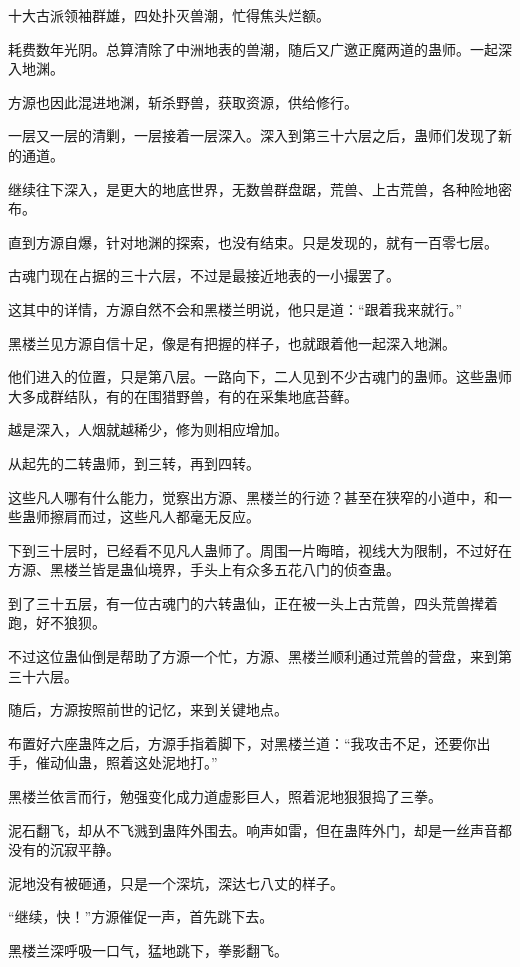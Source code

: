 \begin{this_body}
十大古派领袖群雄，四处扑灭兽潮，忙得焦头烂额。

耗费数年光阴。总算清除了中洲地表的兽潮，随后又广邀正魔两道的蛊师。一起深入地渊。

方源也因此混进地渊，斩杀野兽，获取资源，供给修行。

一层又一层的清剿，一层接着一层深入。深入到第三十六层之后，蛊师们发现了新的通道。

继续往下深入，是更大的地底世界，无数兽群盘踞，荒兽、上古荒兽，各种险地密布。

直到方源自爆，针对地渊的探索，也没有结束。只是发现的，就有一百零七层。

古魂门现在占据的三十六层，不过是最接近地表的一小撮罢了。

这其中的详情，方源自然不会和黑楼兰明说，他只是道：“跟着我来就行。”

黑楼兰见方源自信十足，像是有把握的样子，也就跟着他一起深入地渊。

他们进入的位置，只是第八层。一路向下，二人见到不少古魂门的蛊师。这些蛊师大多成群结队，有的在围猎野兽，有的在采集地底苔藓。

越是深入，人烟就越稀少，修为则相应增加。

从起先的二转蛊师，到三转，再到四转。

这些凡人哪有什么能力，觉察出方源、黑楼兰的行迹？甚至在狭窄的小道中，和一些蛊师擦肩而过，这些凡人都毫无反应。

下到三十层时，已经看不见凡人蛊师了。周围一片晦暗，视线大为限制，不过好在方源、黑楼兰皆是蛊仙境界，手头上有众多五花八门的侦查蛊。

到了三十五层，有一位古魂门的六转蛊仙，正在被一头上古荒兽，四头荒兽撵着跑，好不狼狈。

不过这位蛊仙倒是帮助了方源一个忙，方源、黑楼兰顺利通过荒兽的营盘，来到第三十六层。

随后，方源按照前世的记忆，来到关键地点。

布置好六座蛊阵之后，方源手指着脚下，对黑楼兰道：“我攻击不足，还要你出手，催动仙蛊，照着这处泥地打。”

黑楼兰依言而行，勉强变化成力道虚影巨人，照着泥地狠狠捣了三拳。

泥石翻飞，却从不飞溅到蛊阵外围去。响声如雷，但在蛊阵外门，却是一丝声音都没有的沉寂平静。

泥地没有被砸通，只是一个深坑，深达七八丈的样子。

“继续，快！”方源催促一声，首先跳下去。

黑楼兰深呼吸一口气，猛地跳下，拳影翻飞。


\end{this_body}
